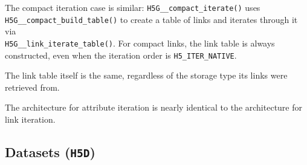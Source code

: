 \begin{itemize}
The compact iteration case is similar: \texttt{H5G\_\_compact\_iterate()} uses \\ \texttt{H5G\_\_compact\_build\_table()} to create a table of links and iterates through it via \\ \texttt{H5G\_\_link\_iterate\_table()}. For compact links, the link table is always constructed, even when the iteration order is \texttt{H5\_ITER\_NATIVE}. 

The link table itself is the same, regardless of the storage type its links were retrieved from.

The architecture for attribute iteration is nearly identical to the architecture for link iteration.

\end{itemize}

\subsection{Datasets (\texttt{H5D})}


